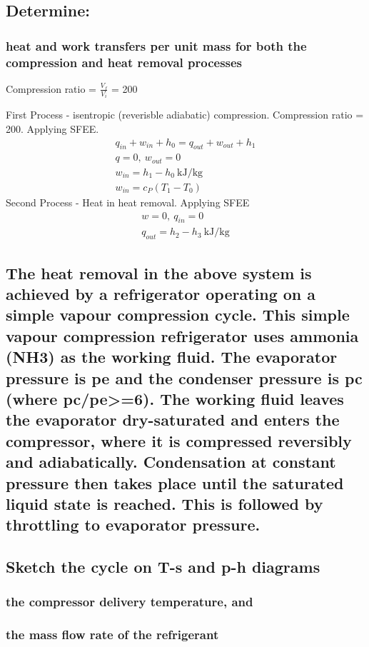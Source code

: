 \documentclass[12pt]{article}
\numberwithin{equation}{section}
\begin{document}
\begin{flushleft}
\subsection{Determine:}
\subsubsection{heat and work transfers per unit mass for both the compression and heat removal processes}
Compression ratio = $\frac{V_f}{V_i}$ = 200

First Process - isentropic (reverisble adiabatic) compression.
Compression ratio = 200.
Applying SFEE.
\begin{gather}
  q_{in} + w_{in} + h_0 = q_{out} + w_{out} + h_1\\
  q = 0, \ w_{out} = 0\\
  w_{in} = h_1 - h_0 \ \si{\kilo\joule\per\kg}\\
  w_{in} = c_P (T_1 - T_0)
\end{gather}
Second Process - Heat in heat removal.
Applying SFEE
\begin{gather}
  w= 0, \ q_{in} = 0\\
  q_{out} = h_2 - h_3 \ \si{\kilo\joule\per\kg}
\end{gather}

\subsection{The heat removal in the above system is achieved by a refrigerator operating on a simple vapour compression cycle. This simple vapour compression refrigerator uses ammonia (NH3) as the working fluid. The evaporator pressure is pe and the condenser pressure is pc (where pc/pe>=6). The working fluid leaves the evaporator dry-saturated and enters the compressor, where it is compressed reversibly and adiabatically. Condensation at constant pressure then takes place until the saturated liquid state is reached. This is followed by throttling to evaporator pressure.}
\subsection{Sketch the cycle on T-s and p-h diagrams}
\subsubsection{the compressor delivery temperature, and}
\subsubsection{the mass flow rate of the refrigerant}


\end{flushleft}
\end{document}
